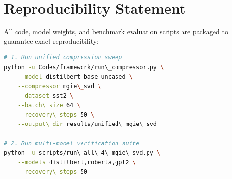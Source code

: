 \section{Reproducibility Statement}
All code, model weights, and benchmark evaluation scripts are packaged to guarantee exact reproducibility:
\begin{lstlisting}[language=bash]
# 1. Run unified compression sweep
python -u Codes/framework/run\_compressor.py \
    --model distilbert-base-uncased \
    --compressor mgie\_svd \
    --dataset sst2 \
    --batch\_size 64 \
    --recovery\_steps 50 \
    --output\_dir results/unified\_mgie\_svd

# 2. Run multi-model verification suite
python -u scripts/run\_all\_4\_mgie\_svd.py \
    --models distilbert,roberta,gpt2 \
    --recovery\_steps 50
\end{lstlisting}
